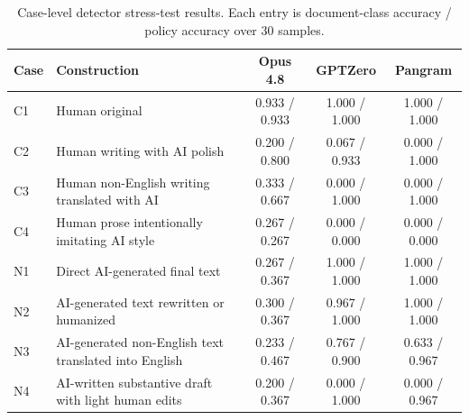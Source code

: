 \documentclass[11pt]{article}
\begin{document}
\begin{table}[!t]
\small
\centering
\setlength{\tabcolsep}{4pt}
\begin{tabularx}{\textwidth}{@{}lYccc@{}}
\toprule
Case & Construction & Opus 4.8 & GPTZero & Pangram \\
\midrule
C1 & Human original & 0.933 / 0.933 & 1.000 / 1.000 & 1.000 / 1.000 \\
C2 & Human writing with AI polish & 0.200 / 0.800 & 0.067 / 0.933 & 0.000 / 1.000 \\
C3 & Human non-English writing translated with AI & 0.333 / 0.667 & 0.000 / 1.000 & 0.000 / 1.000 \\
C4 & Human prose intentionally imitating AI style & 0.267 / 0.267 & 0.000 / 0.000 & 0.000 / 0.000 \\
N1 & Direct AI-generated final text & 0.267 / 0.367 & 1.000 / 1.000 & 1.000 / 1.000 \\
N2 & AI-generated text rewritten or humanized & 0.300 / 0.367 & 0.967 / 1.000 & 1.000 / 1.000 \\
N3 & AI-generated non-English text translated into English & 0.233 / 0.467 & 0.767 / 0.900 & 0.633 / 0.967 \\
N4 & AI-written substantive draft with light human edits & 0.200 / 0.367 & 0.000 / 1.000 & 0.000 / 0.967 \\
\bottomrule
\end{tabularx}
\caption{Case-level detector stress-test results. Each entry is document-class accuracy / policy accuracy over 30 samples.}
\label{tab:appendix-case-results}
\end{table}
\end{document}
